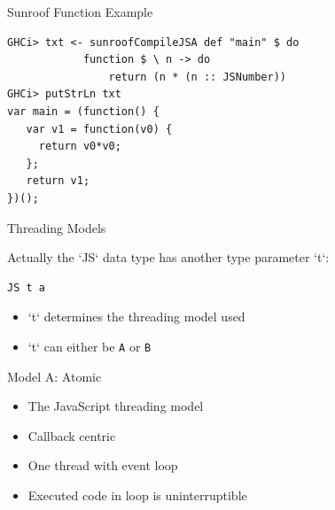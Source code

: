 \documentclass{beamer}
\begin{document}
\begin{frame}[fragile]{Sunroof Function Example}

\begin{codeblock}[0.8]
\begin{verbatim}
GHCi> txt <- sunroofCompileJSA def "main" $ do
            function $ \ n -> do
                return (n * (n :: JSNumber))
GHCi> putStrLn txt
var main = (function() {
   var v1 = function(v0) {
     return v0*v0;
   };
   return v1;
})();
\end{verbatim}
\end{codeblock}

\end{frame}



\begin{frame}[fragile]{Threading Models}

Actually the `JS` data type has another type parameter `t`:

\begin{codeblock}[0.2]
\small
\begin{verbatim}
JS t a
\end{verbatim}
\end{codeblock}

\begin{itemize}
\item `t` determines the threading model used
\item `t` can either be \verb`A` or \verb`B`
\end{itemize}

\end{frame}

\begin{frame}[fragile]{Model A: Atomic}

\begin{itemize}
\item The JavaScript threading model
\item Callback centric
\item One thread with event loop
\item Executed code in loop is uninterruptible
\end{itemize}
\end{frame}
\end{document}
